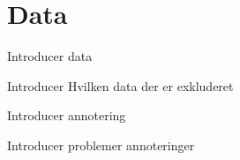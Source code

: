 \section{Data}\label{section:data}
Introducer data

Introducer Hvilken data der er exkluderet

Introducer annotering

Introducer problemer annoteringer
